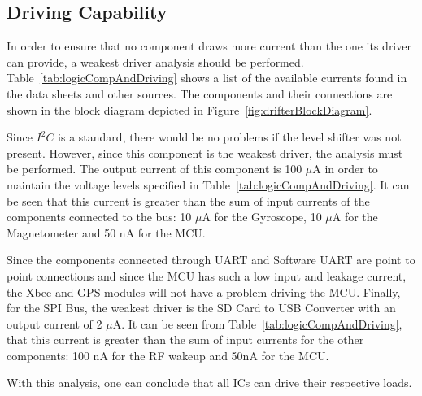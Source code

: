   \vspace{-2cm}

\subsection{Driving Capability}

In order to ensure that no component draws more current than the one its driver can provide, a weakest driver analysis should be performed. Table~\ref{tab:logicCompAndDriving} shows a list of the available currents found in the data sheets and other sources. The components and their connections are shown in the block diagram depicted in Figure~\ref{fig:drifterBlockDiagram}.

Since $I^2C$ is a standard, there would be no problems if the level shifter was not present.  However, since this component is the weakest driver, the analysis must be performed.  The output current of this component is 100 $\mu$A in order to maintain the voltage levels specified in Table~\ref{tab:logicCompAndDriving}.  It can be seen that this current is greater than the sum of input currents of the components connected to the bus: 10 $\mu$A for the Gyroscope, 10 $\mu$A for the Magnetometer and 50 nA for the MCU.

Since the components connected through UART and Software UART are point to point connections and since the MCU has such a low input and leakage current, the Xbee and GPS modules will not have a problem driving the MCU.  Finally, for the SPI Bus, the weakest driver is the SD Card to USB Converter with an output current of 2 $\mu$A.  It can be seen from Table~\ref{tab:logicCompAndDriving}, that this current is greater than the sum of input currents for the other components: 100 nA for the RF wakeup and 50nA for the MCU.

With this analysis, one can conclude that all ICs can drive their respective loads.

